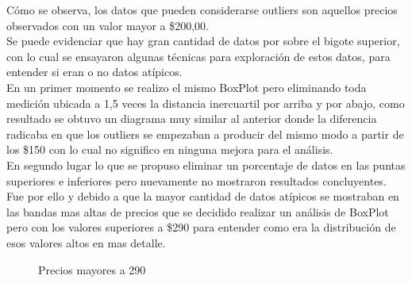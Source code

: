 Cómo se observa, los datos que pueden considerarse outliers son aquellos precios observados con un valor mayor a \$200,00. \\
Se puede evidenciar que hay gran cantidad de datos por sobre el bigote superior, con lo cual se ensayaron algunas técnicas para exploración de estos datos, para entender si eran o no datos atípicos.\\
En un primer momento se realizo el mismo BoxPlot pero eliminando toda medición ubicada a 1,5 veces la distancia inercuartil por arriba y por abajo, como resultado se obtuvo un diagrama muy similar al anterior donde la diferencia radicaba en que los outliers se empezaban a producir del mismo modo a partir de los \$150 con lo cual no significo en ninguna mejora para el análisis.\\
En segundo lugar lo que se propuso eliminar un porcentaje de datos en las puntas superiores e inferiores pero nuevamente no mostraron resultados concluyentes.\\
Fue por ello y debido a que la mayor cantidad de datos atípicos se mostraban en las bandas mas altas de precios que se decidido realizar un análisis de BoxPlot pero con los valores superiores a \$290 para entender como era la distribución de esos valores altos en mas detalle.


\begin{figure}[h]
\centering
{}%
\caption{Precios mayores a 290}
\label{boxplot_mayor290}
\end{figure}


